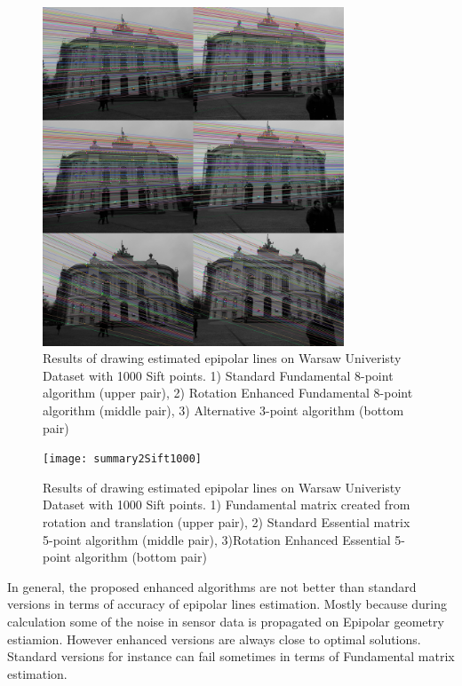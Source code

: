 \begin{figure}[b!]
    \centering
    \includegraphics[width=0.8\textwidth]{summary1Sift1000}
    \caption{Results of drawing estimated epipolar lines on Warsaw Univeristy Dataset with 1000 Sift points. 1) Standard Fundamental 8-point algorithm (upper pair), 2) Rotation Enhanced Fundamental 8-point algorithm (middle pair), 3) Alternative 3-point algorithm (bottom pair) }
    \label{fig:SummaryEpiLines11000}
\end{figure}
\begin{figure}[ht!]
    \centering
    \texttt{[image: summary2Sift1000]}
    \caption{Results of drawing estimated epipolar lines on Warsaw Univeristy Dataset with 1000 Sift points. 1) Fundamental matrix created from rotation and translation (upper pair), 2) Standard Essential matrix 5-point algorithm (middle pair), 3)Rotation Enhanced Essential 5-point algorithm (bottom pair) }
    \label{fig:SummaryEpiLines21000}
\end{figure}
In general, the proposed enhanced algorithms are not better than standard versions in terms of accuracy of epipolar lines estimation. Mostly because during calculation some of the noise in sensor data is propagated on Epipolar geometry estiamion. However enhanced versions are always close to optimal solutions. Standard versions for instance can fail sometimes in terms of Fundamental matrix estimation.
\clearpage

